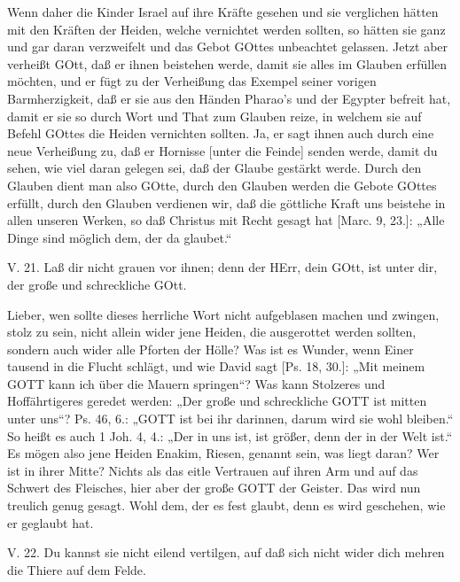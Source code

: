 Wenn daher die Kinder Israel auf ihre Kräfte gesehen und sie verglichen hätten mit den Kräften der Heiden, welche vernichtet werden sollten, so hätten sie ganz und gar daran verzweifelt und das Gebot GOttes unbeachtet gelassen. Jetzt aber verheißt GOtt, daß er ihnen beistehen werde, damit sie alles im Glauben erfüllen möchten, und er fügt zu der Verheißung das Exempel seiner vorigen Barmherzigkeit, daß er sie aus den Händen Pharao’s und der Egypter befreit hat, damit er sie so durch Wort und That zum Glauben reize, in welchem sie auf Befehl GOttes die Heiden vernichten sollten. Ja, er sagt ihnen auch durch eine neue Verheißung zu, daß er Hornisse [unter die Feinde] senden werde, damit du sehen, wie viel daran gelegen sei, daß der Glaube gestärkt werde. Durch den Glauben dient man also GOtte, durch den Glauben werden die Gebote GOttes erfüllt, durch den Glauben verdienen wir, daß die göttliche Kraft uns beistehe in allen unseren Werken, so daß Christus mit Recht gesagt hat [Marc. 9, 23.]: „Alle Dinge sind möglich dem, der da glaubet.“

\begin{schriftzitat}
V. 21. Laß dir nicht grauen vor ihnen; denn der HErr, dein GOtt, ist unter dir, der große und schreckliche GOtt.
\end{schriftzitat}

Lieber, wen sollte dieses herrliche Wort nicht aufgeblasen machen und zwingen, stolz zu sein, nicht allein wider jene Heiden, die ausgerottet
werden sollten, sondern auch wider alle Pforten der Hölle? Was ist es Wunder, wenn Einer tausend in die Flucht schlägt, und wie David sagt [Ps. 18, 30.]: „Mit meinem GOTT kann ich über die Mauern springen“? Was kann Stolzeres und Hoffährtigeres geredet werden: „Der große und schreckliche GOTT ist mitten unter uns“? Ps. 46, 6.: „GOTT ist bei ihr darinnen, darum wird sie wohl bleiben.“ So heißt es auch 1 Joh. 4, 4.: „Der in uns ist, ist größer, denn der in der Welt ist.“ Es mögen also jene Heiden Enakim, Riesen, genannt sein, was liegt daran? Wer ist in ihrer Mitte? Nichts als das eitle Vertrauen auf ihren Arm und auf das Schwert des Fleisches, hier aber der große GOTT der Geister. Das wird nun treulich genug gesagt. Wohl dem, der es fest glaubt, denn es wird geschehen, wie er geglaubt hat.

\begin{schriftzitat}
V. 22. Du kannst sie nicht eilend vertilgen, auf daß sich nicht wider dich mehren die Thiere auf dem Felde.
\end{schriftzitat}

